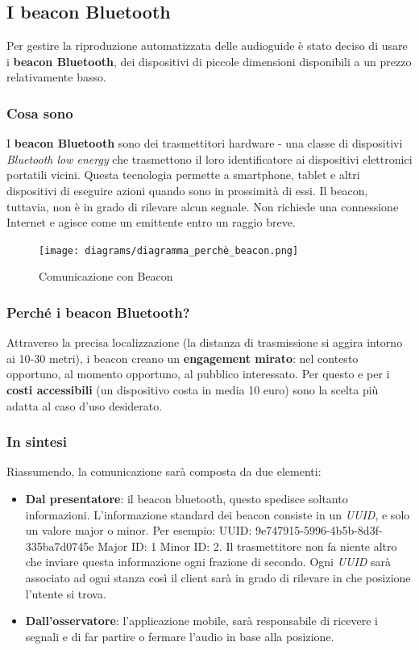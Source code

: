 \subsection{I beacon Bluetooth}
Per gestire la riproduzione automatizzata delle audioguide è stato deciso di usare i \textbf{beacon Bluetooth}, dei dispositivi di piccole dimensioni disponibili a un prezzo relativamente basso. 

\subsubsection{Cosa sono}
I \textbf{beacon Bluetooth} sono dei trasmettitori hardware - una classe di dispositivi \emph{Bluetooth low energy} che trasmettono il loro identificatore ai dispositivi elettronici portatili vicini. Questa tecnologia permette a smartphone, tablet e altri dispositivi di eseguire azioni quando sono in prossimità di essi. Il beacon, tuttavia, non è in grado di rilevare alcun segnale. Non richiede una connessione Internet e agisce come un emittente entro un raggio breve.\cite{what_are_beacons}


\begin{center}
\begin{figure}[htp]
    \centering
    \texttt{[image: diagrams/diagramma\_perchè\_beacon.png]}
    \caption{Comunicazione con Beacon}
    \label{fig:comunicazione_beacon}
\end{figure}
\end{center}

\subsubsection{Perché i beacon Bluetooth?}
Attraverso la precisa localizzazione (la distanza di trasmissione si aggira intorno ai 10-30 metri), i beacon creano un \textbf{engagement mirato}: nel contesto opportuno, al momento opportuno, al pubblico interessato. Per questo e per i \textbf{costi accessibili} (un dispositivo costa in media 10 euro) sono la scelta più adatta al caso d'uso desiderato.

\subsubsection{In sintesi}
Riassumendo, la comunicazione sarà composta da due elementi:
\begin{itemize}
    \item \textbf{Dal presentatore}: il beacon bluetooth, questo spedisce soltanto informazioni. L’informazione standard dei beacon consiste in un \emph{UUID}, e solo un valore major o minor. Per
    esempio: UUID: 9e747915-5996-4b5b-8d3f-335ba7d0745e Major ID: 1 Minor ID: 2. Il trasmettitore non fa niente altro che inviare questa informazione ogni frazione di secondo. Ogni \emph{UUID} sarà associato ad ogni stanza così il client sarà in grado di rilevare in che posizione l'utente si trova.
    \item \textbf{Dall'osservatore}: l'applicazione mobile, sarà responsabile di ricevere i segnali e di far partire o fermare l'audio in base alla posizione.
\end{itemize}

